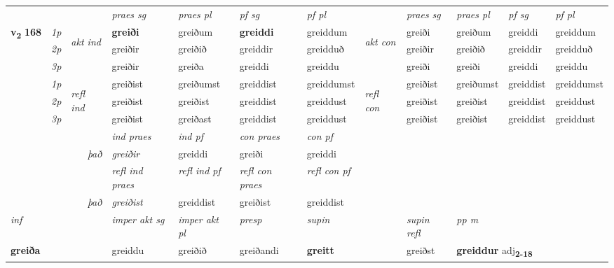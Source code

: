 \begin{longtable}[l]{X>{\footnotesize\itshape}llXXXXlXXXX}
\midrule

 & &   & \textit{praes sg}  & \textit{praes pl}    & \textit{ pf sg} & \textit{pf pl} & & \textit{praes sg}  & \textit{praes pl}    & \textit{pf sg} & \textit{pf pl }  \\ \cmidrule{4-7} \cmidrule{9-12}
 \multirow{2}{*}{{{\textbf{v{\textsubscript{2}}} \Large{\textbf{168}}}}}  & 1p & \multirow{3}{*}{\begin{turn}{90}\textit{akt ind}\end{turn}} & \textbf{greiði} & greiðum & \textbf{greiddi} & greiddum & \multirow{3}{*}{\begin{turn}{90}\textit{akt con}\end{turn}} &greiði & greiðum & greiddi & greiddum\\*
 & 2p &  &  greiðir  & greiðið & greiddir & greidduð & & greiðir & greiðið & greiddir & greidduð \\*
 & 3p &  & greiðir & greiða & greiddi & greiddu & & greiði & greiði& greiddi & greiddu \\*
\cmidrule{4-7} \cmidrule{9-12}
 & 1p & \multirow{3}{*}{\begin{turn}{90}\textit{refl ind}\end{turn}}  & greiðist & greiðumst & greiddist & greiddumst & \multirow{3}{*}{\begin{turn}{90}\textit{refl con}\end{turn}}  &greiðist & greiðumst & greiddist & greiddumst \\*
 & 2p &  & greiðist & greiðist & greiddist & greiddust & &greiðist & greiðist & greiddist & greiddust \\*
 & 3p  & & greiðist & greiðast & greiddist & greiddust & & greiðist & greiðist& greiddist & greiddust \\*
\cmidrule{4-7} \cmidrule{9-12}

   && &  \textit{ind praes} & \textit{ind pf} & \textit{con praes} & \textit{con pf} \\*
\multicolumn{3}{r}{\textit{það}} & greiðir & greiddi & greiði & greiddi \\*

\cmidrule{4-7}
 & && \textit{refl ind praes} & \textit{refl ind pf} & \textit{refl con praes} & \textit{refl con pf} \\*
\multicolumn{3}{r}{\textit{það}}& greiðist & greiddist & greiðist & greiddist \\*

\cmidrule{4-7}
   {\textit{inf}} & &  & \textit{imper akt sg} & \textit{imper akt pl}   & \textit{presp} & \textit{supin} && \textit{supin refl} & \textit{pp m} \\*
  {\textbf{greiða}} & && greiddu  & greiðið   & greiðandi &  \textbf{greitt} && greiðst & \multicolumn{2}{l}{\textbf{greiddur} adj\textbf{\textsubscript{2-18}}} \\*


\end{longtable}

